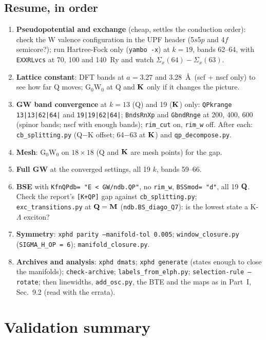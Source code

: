 \subsection{Resume, in order}
\begin{enumerate}[nosep,leftmargin=1.4em]
\item \textbf{Pseudopotential and exchange} (cheap, settles the conduction order): check
the W valence configuration in the UPF header (5$s$5$p$ and 4$f$ semicore?); run
Hartree-Fock only (\texttt{yambo -x}) at $k=19$, bands 62--64, with \texttt{EXXRLvcs}
at 70, 100 and 140~Ry and watch $\Sigma_x(64)-\Sigma_x(63)$.
\item \textbf{Lattice constant}: DFT bands at $a=3.27$ and 3.28~\AA\ (scf + nscf only) to
see how far Q moves; G$_0$W$_0$ at Q and $\mathbf{K}$ only if it changes the picture.
\item \textbf{GW band convergence} at $k=13$ (Q) and 19 ($\mathbf{K}$) only:
\texttt{QPkrange} \texttt{13|13|62|64|} and \texttt{19|19|62|64|}; \texttt{BndsRnXp}
and \texttt{GbndRnge} at 200, 400, 600 (spinor bands; nscf with enough bands);
\texttt{rim\_cut} on, \texttt{rim\_w} off. After each: \texttt{cb\_splitting.py}
(Q$-$K offset; 64$-$63 at $\mathbf{K}$) and \texttt{qp\_decompose.py}.
\item \textbf{Mesh}: G$_0$W$_0$ on $18\times18$ (Q and $\mathbf{K}$ are mesh points) for the gap.
\item \textbf{Full GW} at the converged settings, all 19 $k$, bands 59--66.
\item \textbf{BSE} with \texttt{KfnQPdb= "E < GW/ndb.QP"}, no \texttt{rim\_w},
\texttt{BSSmod= "d"}, all 19 $\mathbf{Q}$. Check the report's \texttt{[K+QP]} gap against
\texttt{cb\_splitting.py}; \texttt{exc\_transitions.py} at $\mathbf{Q}=\mathbf{M}$
(\texttt{ndb.BS\_diago\_Q7}): is the lowest state a K-$\Lambda$ exciton?
\item \textbf{Symmetry}: \texttt{xphd parity --manifold-tol 0.005}; \texttt{window\_closure.py}
(\texttt{SIGMA\_H\_OP = 6}); \texttt{manifold\_closure.py}.
\item \textbf{Archives and analysis}: \texttt{xphd dmats}; \texttt{xphd generate}
(states enough to close the manifolds); \texttt{check-archive}; \texttt{labels\_from\_elph.py};
\texttt{selection-rule --rotate}; then linewidths, \texttt{add\_osc.py}, the BTE and
the maps as in Part~I, Sec.~9.2 (read with the errata).
\end{enumerate}

\section{Validation summary}
\label{sec:summary}

